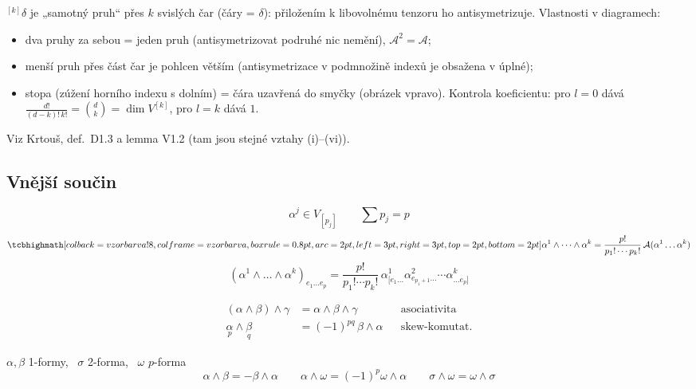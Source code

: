 
\begin{vysvetleni}
${}^{[k]}\delta$ je „samotný pruh“ přes $k$ svislých čar (čáry = $\delta$): přiložením k libovolnému tenzoru ho antisymetrizuje. Vlastnosti v diagramech:
\begin{itemize}[nosep,leftmargin=1.2em]
  \item dva pruhy za sebou = jeden pruh (antisymetrizovat podruhé nic nemění), $\mathcal{A}^2=\mathcal{A}$;
  \item menší pruh přes část čar je pohlcen větším (antisymetrizace v podmnožině indexů je obsažena v úplné);
  \item stopa (zúžení horního indexu s dolním) = čára uzavřená do smyčky (obrázek vpravo). Kontrola koeficientu: pro $l=0$ dává $\frac{d!}{(d-k)!\,k!}=\binom dk=\dim V^{[k]}$, pro $l=k$ dává $1$.
\end{itemize}
Viz Krtouš, def.~D1.3 a lemma V1.2 (tam jsou stejné vztahy (i)--(vi)).
\end{vysvetleni}

\subsection{Vnější součin}

\begin{definice}
\[
  \alpha^j\in V_{[p_j]} \qquad \textstyle\sum p_j = p
\]
\[
  \vzorec{\alpha^1\wedge\dots\wedge\alpha^k = \frac{p!}{p_1!\cdots p_k!}\,\mathcal{A}(\alpha^1\dots\alpha^k)}
\]
\[
  (\alpha^1\wedge\dots\wedge\alpha^k)_{e_1\dots e_p} = \frac{p!}{p_1!\cdots p_k!}\,
  \alpha^1_{[e_1\dots}\alpha^2_{e_{p_1+1}\dots}\cdots\alpha^k_{\dots e_p]}
\]
\end{definice}

\begin{veta}[vlastnosti]
\begin{align*}
  (\alpha\wedge\beta)\wedge\gamma &= \alpha\wedge\beta\wedge\gamma && \text{asociativita} \\
  \underset{p}{\alpha}\wedge\underset{q}{\beta} &= (-1)^{pq}\,\beta\wedge\alpha && \text{skew-komutat.}
\end{align*}
\end{veta}
\begin{priklad}[Př.]
$\alpha,\beta$ 1-formy, \ $\sigma$ 2-forma, \ $\omega$ $p$-forma
\[
  \alpha\wedge\beta = -\beta\wedge\alpha \qquad \alpha\wedge\omega = (-1)^p\omega\wedge\alpha \qquad
  \sigma\wedge\omega = \omega\wedge\sigma
\]
\end{priklad}

